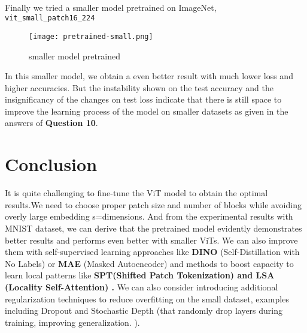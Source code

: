 \documentclass{article}
\begin{document}
\paragraph{}

Finally we tried a smaller model pretrained on ImageNet,
 \texttt{vit\_small\_patch16\_224} 
 \begin{figure}[H]
     \centering
     \texttt{[image: pretrained-small.png]}
     \caption{smaller model pretrained}
     \label{fig:smaller pretrained}
 \end{figure}

In this smaller model, we obtain a even better result with much lower loss and higher accuracies. But the instability shown on the test accuracy and the insignificancy of the changes on test loss indicate that there is still space to improve the learning process of the model on smaller datasets as given in the answers of \textbf{Question 10}.

\section{Conclusion}
It is quite challenging to fine-tune the ViT model to obtain the optimal results.We need to choose proper patch size and number of blocks while avoiding overly large embedding s=dimensions. And from the experimental results with MNIST dataset, we can derive that the pretrained model evidently demonstrates better results and performs even better with smaller ViTs. We can also improve them with self-supervised learning approaches like \textbf{DINO} (Self-Distillation with No Labels) or \textbf{MAE} (Masked Autoencoder)  and methods to boost capacity to learn local patterns like \textbf{SPT(Shifted Patch Tokenization)  and \textbf{LSA (Locality Self-Attention)} .} We can also consider introducing  additional regularization techniques to reduce overfitting on the small dataset, examples including Dropout and Stochastic Depth (that randomly drop layers during training, improving generalization. ).
\end{document}
